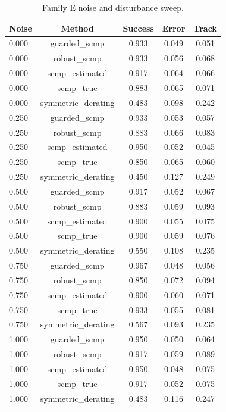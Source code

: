 \begin{table}[t]
\centering
\small
\caption{Family E noise and disturbance sweep.}
\label{tab:noise}
\begin{tabular}{lcccc}
\toprule
Noise & Method & Success & Error & Track \\
\midrule
0.000 & guarded\_scmp & 0.933 & 0.049 & 0.051 \\
0.000 & robust\_scmp & 0.933 & 0.056 & 0.068 \\
0.000 & scmp\_estimated & 0.917 & 0.064 & 0.066 \\
0.000 & scmp\_true & 0.883 & 0.065 & 0.071 \\
0.000 & symmetric\_derating & 0.483 & 0.098 & 0.242 \\
0.250 & guarded\_scmp & 0.933 & 0.053 & 0.057 \\
0.250 & robust\_scmp & 0.883 & 0.066 & 0.083 \\
0.250 & scmp\_estimated & 0.950 & 0.052 & 0.045 \\
0.250 & scmp\_true & 0.850 & 0.065 & 0.060 \\
0.250 & symmetric\_derating & 0.450 & 0.127 & 0.249 \\
0.500 & guarded\_scmp & 0.917 & 0.052 & 0.067 \\
0.500 & robust\_scmp & 0.883 & 0.059 & 0.093 \\
0.500 & scmp\_estimated & 0.900 & 0.055 & 0.075 \\
0.500 & scmp\_true & 0.900 & 0.059 & 0.076 \\
0.500 & symmetric\_derating & 0.550 & 0.108 & 0.235 \\
0.750 & guarded\_scmp & 0.967 & 0.048 & 0.056 \\
0.750 & robust\_scmp & 0.850 & 0.072 & 0.094 \\
0.750 & scmp\_estimated & 0.900 & 0.060 & 0.071 \\
0.750 & scmp\_true & 0.933 & 0.055 & 0.081 \\
0.750 & symmetric\_derating & 0.567 & 0.093 & 0.235 \\
1.000 & guarded\_scmp & 0.950 & 0.050 & 0.064 \\
1.000 & robust\_scmp & 0.917 & 0.059 & 0.089 \\
1.000 & scmp\_estimated & 0.950 & 0.048 & 0.075 \\
1.000 & scmp\_true & 0.917 & 0.052 & 0.075 \\
1.000 & symmetric\_derating & 0.483 & 0.116 & 0.247 \\
\bottomrule
\end{tabular}
\end{table}
